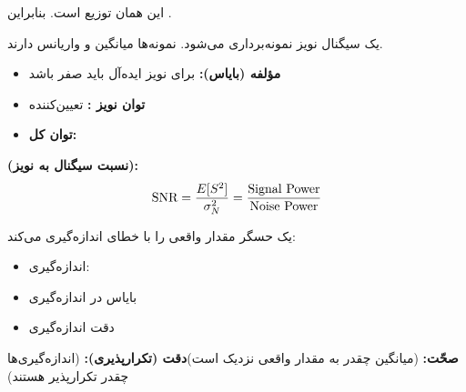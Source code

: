 این همان  توزیع  است. بنابراین .



یک سیگنال نویز  نمونه‌برداری می‌شود. نمونه‌ها میانگین  و واریانس  دارند.

\begin{itemize}
\tightlist
\item
  \textbf{مؤلفه  (بایاس):}  برای نویز ایده‌آل باید صفر باشد
\item
  \textbf{توان نویز :}  تعیین‌کننده 
\item
  \textbf{توان کل:} 
\end{itemize}

\textbf{ (نسبت سیگنال به نویز):}\PSbr{}\[\text{SNR} = \frac{E[S^2]}{\sigma_N^2} = \frac{\text{Signal Power}}{\text{Noise Power}}\]


یک حسگر مقدار واقعی \lr{\ensuremath{\theta}} را با خطای  اندازه‌گیری می‌کند:

\begin{itemize}
\tightlist
\item
  اندازه‌گیری: 
\item
   بایاس در اندازه‌گیری
\item
   دقت اندازه‌گیری
\end{itemize}

\textbf{صحّت:}  (میانگین چقدر به مقدار واقعی نزدیک است)\PSbr{}\textbf{دقت (تکرارپذیری):}  (اندازه‌گیری‌ها چقدر تکرارپذیر هستند)

